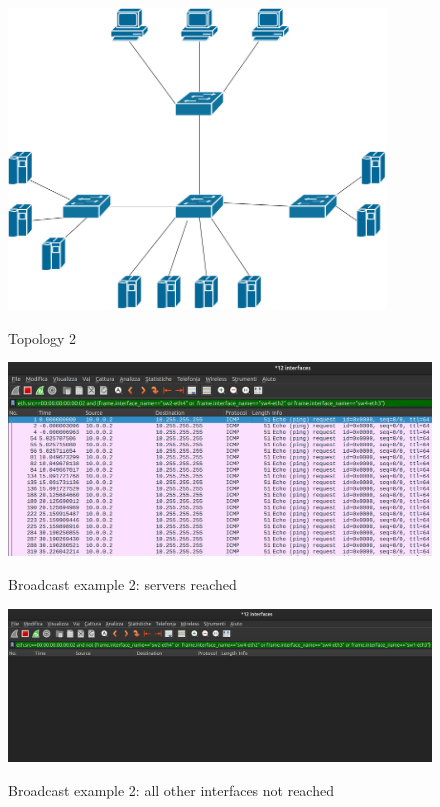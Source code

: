 \documentclass{article}
\begin{document}
\begin{figure}[H]
    \includegraphics[width=10cm, center]{images/2-topo.png}
    \label{fig:2topo}
    \caption{Topology 2}
\end{figure}

\begin{figure}[H]
    \includegraphics[width=12cm, center]{images/2-reached.png}
    \label{fig:2reac}
    \caption{Broadcast example 2: servers reached}
\end{figure}

\begin{figure}[H]
    \includegraphics[width=12cm, center]{images/2-unreached.png}
    \label{fig:2unreac}
    \caption{Broadcast example 2: all other interfaces not reached}
\end{figure}
\end{document}
